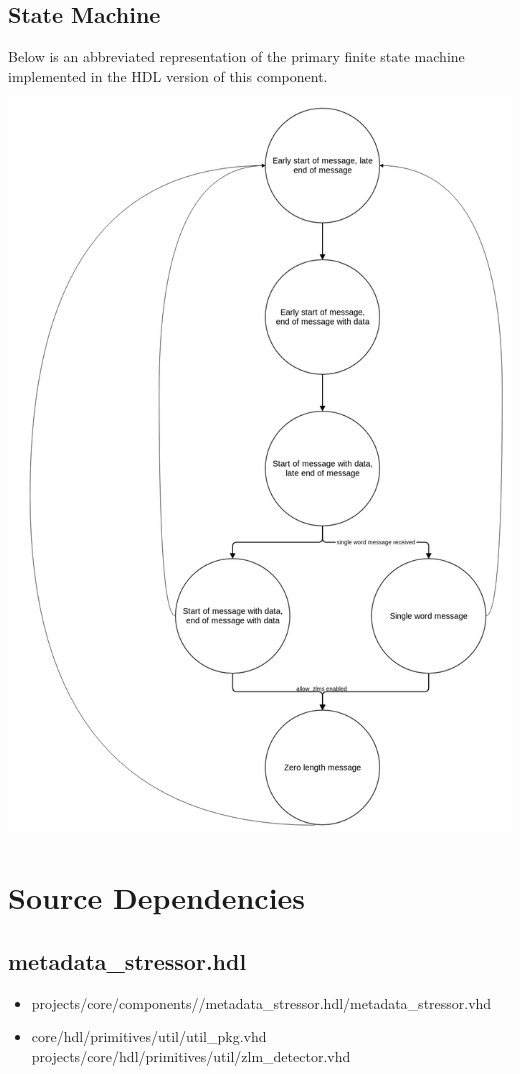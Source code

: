 \documentclass{article}
\def\comp{metadata\_stressor}
\begin{document}
\subsection*{State Machine}
\begin{flushleft}
Below is an abbreviated representation of the primary finite state machine implemented in the HDL version of this component.
\end{flushleft}
\begin{center}
	\centering\captionsetup{type=figure}\includegraphics[scale=0.25]{ms_fsm_abrv}
\end{center}

\section*{Source Dependencies}
\subsection*{\comp.hdl}
\begin{itemize}
	\item projects/core/components//metadata\_stressor.hdl/metadata\_stressor.vhd
	\item core/hdl/primitives/util/util\_pkg.vhd
	      \subitem projects/core/hdl/primitives/util/zlm\_detector.vhd
\end{itemize}
\end{document}
